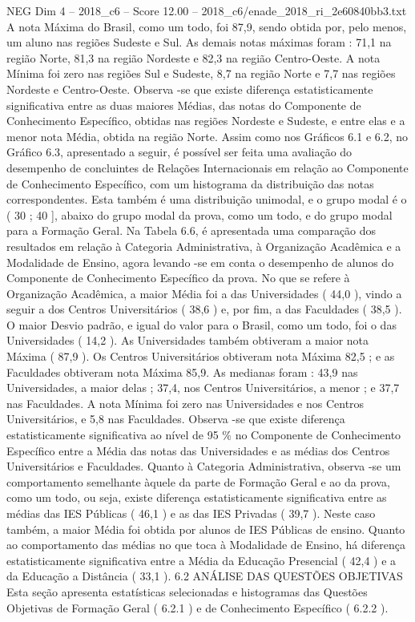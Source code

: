 \begin{textsample}{NEG Dim 4 – 2018\_c6 – Score 12.00 – 2018\_c6/enade\_2018\_ri\_2e60840bb3.txt}
A nota Máxima do Brasil, como um todo, foi 87,9, sendo obtida por, pelo menos, um aluno nas regiões Sudeste e Sul.
As demais notas máximas foram : 71,1 na região Norte, 81,3 na região Nordeste e 82,3 na região Centro-Oeste.
A nota Mínima foi zero nas regiões Sul e Sudeste, 8,7 na região Norte e 7,7 nas regiões Nordeste e Centro-Oeste.
Observa -se que existe diferença estatisticamente significativa entre as duas maiores Médias, das notas do Componente de Conhecimento Específico, obtidas nas regiões Nordeste e Sudeste, e entre elas e a menor nota Média, obtida na região Norte.
Assim como nos Gráficos 6.1 e 6.2, no Gráfico 6.3, apresentado a seguir, é possível ser feita uma avaliação do desempenho de concluintes de Relações Internacionais em relação ao Componente de Conhecimento Específico, com um histograma da distribuição das notas correspondentes.
Esta também é uma distribuição unimodal, e o grupo modal é o ( 30 ; 40 ], abaixo do grupo modal da prova, como um todo, e do grupo modal para a Formação Geral.
Na Tabela 6.6, é apresentada uma comparação dos resultados em relação à Categoria Administrativa, à Organização Acadêmica e a Modalidade de Ensino, agora levando -se em conta o desempenho de alunos do Componente de Conhecimento Específico da prova.
No que se refere à Organização Acadêmica, a maior Média foi a das Universidades ( 44,0 ), vindo a seguir a dos Centros Universitários ( 38,6 ) e, por fim, a das Faculdades ( 38,5 ).
O maior Desvio padrão, e igual do valor para o Brasil, como um todo, foi o das Universidades ( 14,2 ).
As Universidades também obtiveram a maior nota Máxima ( 87,9 ).
Os Centros Universitários obtiveram nota Máxima 82,5 ; e as Faculdades obtiveram nota Máxima 85,9.
As medianas foram : 43,9 nas Universidades, a maior delas ; 37,4, nos Centros Universitários, a menor ; e 37,7 nas Faculdades.
A nota Mínima foi zero nas Universidades e nos Centros Universitários, e 5,8 nas Faculdades.
Observa -se que existe diferença estatisticamente significativa ao nível de 95 \% no Componente de Conhecimento Específico entre a Média das notas das Universidades e as médias dos Centros Universitários e Faculdades.
Quanto à Categoria Administrativa, observa -se um comportamento semelhante àquele da parte de Formação Geral e ao da prova, como um todo, ou seja, existe diferença estatisticamente significativa entre as médias das IES Públicas ( 46,1 ) e as das IES Privadas ( 39,7 ).
Neste caso também, a maior Média foi obtida por alunos de IES Públicas de ensino.
Quanto ao comportamento das médias no que toca à Modalidade de Ensino, há diferença estatisticamente significativa entre a Média da Educação Presencial ( 42,4 ) e a da Educação a Distância ( 33,1 ). 6.2 ANÁLISE DAS QUESTÕES OBJETIVAS Esta seção apresenta estatísticas selecionadas e histogramas das Questões Objetivas de Formação Geral ( 6.2.1 ) e de Conhecimento Específico ( 6.2.2 ).

\end{textsample}
